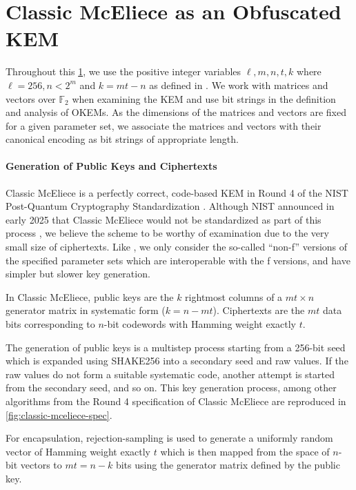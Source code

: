 \section{Classic McEliece as an Obfuscated KEM} \label{sec:obfuscating-classic-mceliece}

Throughout this \cref{sec:obfuscating-classic-mceliece}, we use the positive integer variables $\ell, m,n,t,k$ where $\ell = 256, n < 2^m$ and $k=mt-n$ as defined in \cite{NISTPQC-R4:ClassicMcEliece22}. We work with matrices and vectors over $\mathbb F_2$ when examining the KEM and use bit strings in the definition and analysis of OKEMs. As the dimensions of the matrices and vectors are fixed for a given parameter set, we associate the matrices and vectors with their canonical encoding as bit strings of appropriate length.

\paragraph{Generation of Public Keys and Ciphertexts}
Classic McEliece \cite{NISTPQC-R4:ClassicMcEliece22} is a perfectly correct, code-based KEM in Round 4 of the NIST Post-Quantum Cryptography Standardization \cite{nist-standardization}. Although NIST announced in early 2025 that Classic McEliece would not be standardized as part of this process \cite{nist-ir-8545}, we believe the scheme to be worthy of examination due to the very small size of ciphertexts. Like \cite{EC:Xagawa22}, we only consider the so-called ``non-f'' versions of the specified parameter sets which are interoperable with the f versions, and have simpler but slower key generation.
 
In Classic McEliece, public keys are the $k$ rightmost columns of a $mt \times n$ generator matrix in systematic form ($k = n - mt$). Ciphertexts are the $mt$ data bits corresponding to $n$-bit codewords with Hamming weight exactly $t$.

The generation of public keys is a multistep process starting from a 256-bit seed which is expanded using SHAKE256 into a secondary seed and raw values. If the raw values do not form a suitable systematic code, another attempt is started from the secondary seed, and so on. This key generation process, among other algorithms from the Round 4 specification of Classic McEliece are reproduced in \cref{fig:classic-mceliece-spec}.

For encapsulation, rejection-sampling is used to generate a uniformly random vector of Hamming weight exactly $t$ which is then mapped from the space of $n$-bit vectors to $mt=n-k$ bits using the generator matrix defined by the public key.

